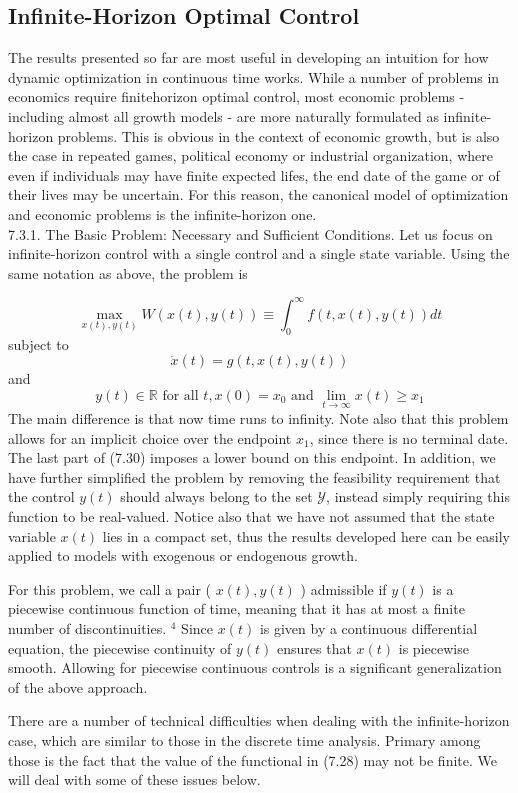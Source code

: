 \documentclass[\topdir/lecture_notes.tex]{subfiles}
\begin{document}
\subsection{Infinite-Horizon Optimal Control}
The results presented so far are most useful in developing an intuition for how dynamic optimization in continuous time works. While a number of problems in economics require finitehorizon optimal control, most economic problems - including almost all growth models - are more naturally formulated as infinite-horizon problems. This is obvious in the context of economic growth, but is also the case in repeated games, political economy or industrial organization, where even if individuals may have finite expected lifes, the end date of the game or of their lives may be uncertain. For this reason, the canonical model of optimization and economic problems is the infinite-horizon one.\\
7.3.1. The Basic Problem: Necessary and Sufficient Conditions. Let us focus on infinite-horizon control with a single control and a single state variable. Using the same notation as above, the problem is

\[
\max _{x(t), y(t)} W(x(t), y(t)) \equiv \int_{0}^{\infty} f(t, x(t), y(t)) d t
\]
subject to
\[
\dot{x}(t)=g(t, x(t), y(t))
\]
and
\[
y(t) \in \mathbb{R} \text { for all } t, x(0)=x_{0} \text { and } \lim _{t \rightarrow \infty} x(t) \geq x_{1}
\]
The main difference is that now time runs to infinity. Note also that this problem allows for an implicit choice over the endpoint $x_{1}$, since there is no terminal date. The last part of (7.30) imposes a lower bound on this endpoint. In addition, we have further simplified the problem by removing the feasibility requirement that the control $y(t)$ should always belong to the set $\mathcal{Y}$, instead simply requiring this function to be real-valued. Notice also that we have not assumed that the state variable $x(t)$ lies in a compact set, thus the results developed here can be easily applied to models with exogenous or endogenous growth.

For this problem, we call a pair ( $x(t), y(t)$ ) admissible if $y(t)$ is a piecewise continuous function of time, meaning that it has at most a finite number of discontinuities. ${ }^{4}$ Since $x(t)$ is given by a continuous differential equation, the piecewise continuity of $y(t)$ ensures that $x(t)$ is piecewise smooth. Allowing for piecewise continuous controls is a significant generalization of the above approach.

There are a number of technical difficulties when dealing with the infinite-horizon case, which are similar to those in the discrete time analysis. Primary among those is the fact that the value of the functional in (7.28) may not be finite. We will deal with some of these issues below.
\end{document}
